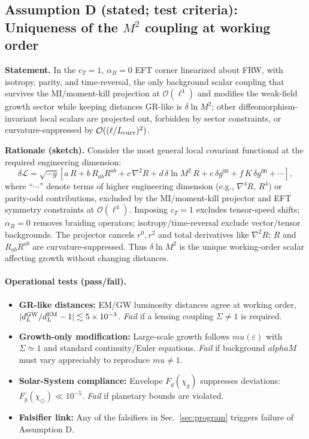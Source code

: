 \documentclass[aps,prd,onecolumn,superscriptaddress,nofootinbib]{revtex4-2}
\def\mu{mu}%
\def\alpha{alpha}%
\def\alpha_M{alphaM}%
\providecommand{\be}{\begin{equation}}
\providecommand{\ee}{\end{equation}}
\begin{document}
\subsection{Assumption D (stated; test criteria): Uniqueness of the \texorpdfstring{$M^2$}{M^2} coupling at working order}
\label{sec:lemmaD}

\noindent\textbf{Statement.} In the c\(_T\!=\!1\), \(\alpha_B\!=\!0\) EFT corner linearized about FRW, with isotropy, parity, and time-reversal, the only background scalar coupling that survives the MI/moment-kill projection at \(\mathcal O(\ell^4)\) and modifies the weak-field growth sector while keeping distances GR-like is \(\delta\ln M^2\); other diffeomorphism-invariant local scalars are projected out, forbidden by sector constraints, or curvature-suppressed by \(\mathcal O((\ell/L_{\rm curv})^2)\).

\smallskip
\noindent\textbf{Rationale (sketch).} Consider the most general local covariant functional at the required engineering dimension:
\be
\delta\mathcal L=\sqrt{-g}\left[a\,R+b\,R_{ab}R^{ab}+c\,\nabla^2 R+d\,\delta\ln M^2\,R
+ e\,\delta g^{00}+ f\,K\,\delta g^{00}+ \cdots\right],
\ee
\noindent where ``\(\cdots\)'' denote terms of higher engineering dimension (e.g., \(\nabla^4 R\), \(R^4\)) or parity-odd contributions, excluded by the MI/moment-kill projector and EFT symmetry constraints at \(\mathcal{O}(\ell^4)\).
Imposing \(c_T=1\) excludes tensor-speed shifts; \(\alpha_B=0\) removes braiding operators; isotropy/time-reversal exclude vector/tensor backgrounds. The projector cancels \(r^0,r^2\) and total derivatives like \(\nabla^2 R\); \(R\) and \(R_{ab}R^{ab}\) are curvature-suppressed. Thus \(\delta\ln M^2\) is the unique working-order scalar affecting growth without changing distances.

\paragraph{Operational tests (pass/fail).}
\begin{itemize}[leftmargin=*,noitemsep,topsep=0pt]
\item \textbf{GR-like distances:} EM/GW luminosity distances agree at working order, $|d_L^{\rm GW}/d_L^{\rm EM}-1|\lesssim5\times10^{-3}$. \emph{Fail} if a lensing coupling $\Sigma\neq1$ is required.
\item \textbf{Growth-only modification:} Large-scale growth follows $\mu(\varepsilon)$ with $\Sigma\simeq1$ and standard continuity/Euler equations. \emph{Fail} if background $\alpha_M$ must vary appreciably to reproduce $\mu\neq1$.
\item \textbf{Solar-System compliance:} Envelope $F_g(\chi_g)$ suppresses deviations: $F_g(\chi_\odot)\ll10^{-5}$. \emph{Fail} if planetary bounds are violated.
\item \textbf{Falsifier link:} Any of the falsifiers in Sec.~\ref{sec:program} triggers failure of Assumption D.
\end{itemize}
\end{document}
